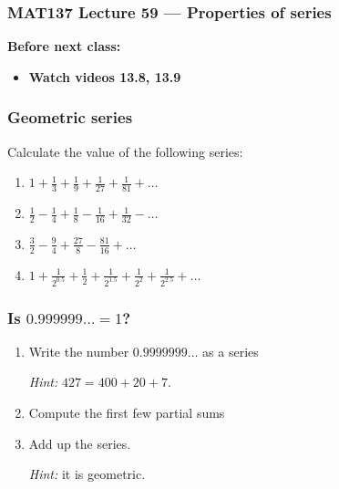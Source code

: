 \documentclass[14pt]{beamer}
\newcommand{\p}{\pause}
\newcommand{\setsize}[1]{\fontsize{#1}{#1}\selectfont} %
\newcommand{\smallerfont}{\setsize{13}} %
\newcommand{\vv}{\vspace{.5cm}}
\begin{document}
\begin{frame}
	\frametitle{MAT137 Lecture 59 --- Properties of series  }

	\vfill
	{\bf Before next class:}
		\begin{itemize} \normalsize
			\item {\bf Watch videos 13.8, 13.9 }
		\end{itemize}
\end{frame}

	\begin{frame}[t]
		\smallerfont
		\frametitle{Geometric series}

		Calculate the value of the following series:

		\begin{enumerate}
			\item ${\displaystyle 1 + \frac{1}{3}+ \frac{1}{9}+ \frac{1}{27} + \frac{1}{81} + \ldots}$
				\vv

			\item ${\displaystyle \frac{1}{2} - \frac{1}{4} + \frac{1}{8} - \frac{1}{16} + \frac{1}{32} - \ldots}$
				\vv

			\item ${\displaystyle \frac{3}{2} - \frac{9}{4} + \frac{27}{8} - \frac{81}{16} + \ldots}$
				\vv

			\item ${\displaystyle  1 + \frac{1}{2^{0.5}} + \frac{1}{2} + \frac{1}{2^{1.5}} + \frac{1}{2^{2}} + \frac{1}{2^{2.5}} + \ldots}$
				\vv
		\end{enumerate}
	\end{frame}

	\begin{frame}[t]
		\frametitle{Is ${\displaystyle 0.999999\ldots = 1}$?}

		\p
		\begin{enumerate}
			\item Write the number \; ${\displaystyle 0.9999999\ldots}$ \; as a series

				\emph{Hint:} ${\displaystyle 427 = 400 + 20 + 7}$. \vv

			\item Compute the first few partial sums \vv

			\item Add up the series.

				\emph{Hint:} it is geometric.
		\end{enumerate}
	\end{frame}
\end{document}
